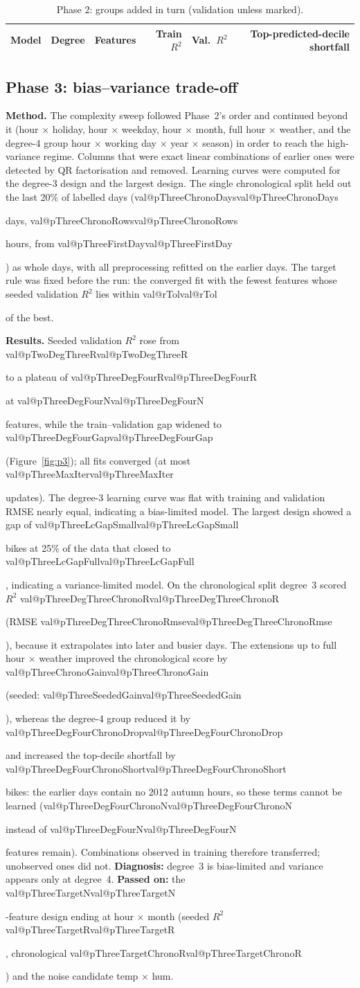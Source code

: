 \documentclass[10pt,a4paper]{article}
\makeatletter
\newcommand{\val}[1]{\ifcsname val@#1\endcsname\csname val@#1\endcsname\else
  \PackageError{report}{Undefined value #1}{Rebuild with report/build_report.py}\fi}
\newcommand{\x}{\ensuremath{\times}}
\makeatother
\begin{document}
\begin{table}[t]
  \centering\small
  \caption{Phase 2: groups added in turn (validation unless marked).}
  \label{tab:p2}
  \begin{tabular}{@{}lrrrrr@{}}
    \toprule
    Model & Degree & Features & Train $R^2$ & Val.\ $R^2$ & Top-predicted-decile shortfall \\
    \midrule
    
  \end{tabular}
\end{table}

\subsection{Phase 3: bias--variance trade-off}
\textbf{Method.} The complexity sweep followed Phase~2's order and continued beyond it (hour \x{} holiday, hour \x{} weekday, hour \x{} month, full hour \x{} weather, and the degree-4 group hour \x{} working day \x{} year \x{} season) in order to reach the high-variance regime. Columns that were exact linear combinations of earlier ones were detected by QR factorisation and removed. Learning curves were computed for the degree-3 design and the largest design. The single chronological split held out the last 20\% of labelled days (\val{pThreeChronoDays} days, \val{pThreeChronoRows} hours, from \val{pThreeFirstDay}) as whole days, with all preprocessing refitted on the earlier days. The target rule was fixed before the run: the converged fit with the fewest features whose seeded validation $R^2$ lies within \val{rTol} of the best.

\textbf{Results.} Seeded validation $R^2$ rose from \val{pTwoDegThreeR} to a plateau of \val{pThreeDegFourR} at \val{pThreeDegFourN} features, while the train--validation gap widened to \val{pThreeDegFourGap} (Figure~\ref{fig:p3}); all fits converged (at most \val{pThreeMaxIter} updates). The degree-3 learning curve was flat with training and validation RMSE nearly equal, indicating a bias-limited model. The largest design showed a gap of \val{pThreeLcGapSmall} bikes at 25\% of the data that closed to \val{pThreeLcGapFull}, indicating a variance-limited model. On the chronological split degree~3 scored $R^2$ \val{pThreeDegThreeChronoR} (RMSE \val{pThreeDegThreeChronoRmse}), because it extrapolates into later and busier days. The extensions up to full hour \x{} weather improved the chronological score by \val{pThreeChronoGain} (seeded: \val{pThreeSeededGain}), whereas the degree-4 group reduced it by \val{pThreeDegFourChronoDrop} and increased the top-decile shortfall by \val{pThreeDegFourChronoShort} bikes: the earlier days contain no 2012 autumn hours, so these terms cannot be learned (\val{pThreeDegFourChronoN} instead of \val{pThreeDegFourN} features remain). Combinations observed in training therefore transferred; unobserved ones did not. \textbf{Diagnosis:} degree~3 is bias-limited and variance appears only at degree~4. \textbf{Passed on:} the \val{pThreeTargetN}-feature design ending at hour \x{} month (seeded $R^2$ \val{pThreeTargetR}, chronological \val{pThreeTargetChronoR}) and the noise candidate temp \x{} hum.
\end{document}
